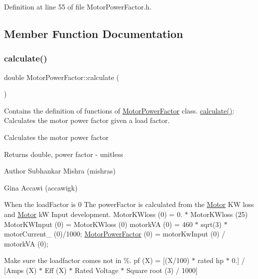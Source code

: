 Definition at line 55 of file Motor\+Power\+Factor.\+h.



\subsection{Member Function Documentation}
\mbox{\label{class_motor_power_factor_ac9d5742db4a371bc4e15d5b29d335b6e}} 
\subsubsection{\texorpdfstring{calculate()}{calculate()}}
{\footnotesize\ttfamily double Motor\+Power\+Factor\+::calculate (\begin{DoxyParamCaption}{ }\end{DoxyParamCaption})}



Contains the definition of functions of \hyperlink{class_motor_power_factor}{Motor\+Power\+Factor} class. \hyperlink{class_motor_power_factor_ac9d5742db4a371bc4e15d5b29d335b6e}{calculate()}\+: Calculates the motor power factor given a load factor. 

Calculates the motor power factor

\begin{DoxyReturn}{Returns}
double, power factor -\/ unitless
\end{DoxyReturn}
\begin{DoxyAuthor}{Author}
Subhankar Mishra (mishras) 

Gina Accawi (accawigk) 
\end{DoxyAuthor}
When the load\+Factor is 0 The power\+Factor is calculated from the \hyperlink{class_motor}{Motor} KW loss and \hyperlink{class_motor}{Motor} kW Input development. Motor\+K\+Wloss (0) = 0. $\ast$ Motor\+K\+Wloss (25) Motor\+K\+W\+Input (0) = Motor\+K\+Wloss (0) motork\+VA (0) = 460 $\ast$ sqrt(3) $\ast$ motor\+Current\+\_\+ (0)/1000; \hyperlink{class_motor_power_factor}{Motor\+Power\+Factor} (0) = motor\+Kw\+Input (0) / motork\+VA (0);

Make sure the loadfactor comes not in \%. pf (X) = \mbox{[}(X/100) $\ast$ rated hp $\ast$ 0.\mbox{]} / \mbox{[}Amps (X) $\ast$ Eff (X) $\ast$ Rated Voltage $\ast$ Square root (3) / 1000\mbox{]}


